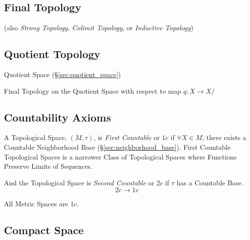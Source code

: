 \subsection{Final Topology}\label{sec:final_topology}

(also \emph{Strong Topology}, \emph{Colimit Topology}, or
\emph{Inductive Topology})



\subsection{Quotient Topology}\label{sec:quotient_topology}

Quotient Space (\S\ref{sec:quotient_space})

Final Topology on the Quotient Space with respect to map $q : X
\rightarrow X / ~$



\subsection{Countability Axioms}\label{sec:countability_axioms}

A Topological Space, $(M,\tau)$, is \emph{First Countable} or $1c$ if
$\forall X \in M$, there exists a Countable Neighborhood Base
(\S\ref{sec:neighborhood_base}). First Countable Topological Spaces is
a narrower Class of Topological Spaces where Functions Preserve Limits
of Sequences. %

And the Topological Space is \emph{Second Countable} or $2c$ if $\tau$
has a Countable Base.
\[
  2c \rightarrow 1c
\]

All Metric Spaces are $1c$.



\subsection{Compact Space}\label{sec:compact_space}

